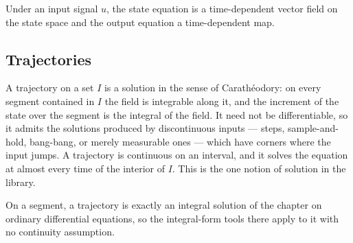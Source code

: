





Under an input signal $u$, the state equation is a time-dependent vector field on the state space
and the output equation a time-dependent map.



\subsection{Trajectories}

A trajectory on a set $I$ is a solution in the sense of Carath\'eodory: on every segment
contained in $I$ the field is integrable along it, and the increment of the state over the segment
is the integral of the field.  It need not be
differentiable, so it admits the solutions produced by discontinuous inputs --- steps,
sample-and-hold, bang-bang, or merely measurable ones --- which have corners where the input
jumps.  A trajectory is continuous on an interval, and it solves the equation at almost every
time of the interior of $I$.  This is the
one notion of solution in the library.







On a segment, a trajectory is exactly an integral solution of the chapter on ordinary differential
equations, so the integral-form tools there apply to it with no continuity assumption.

